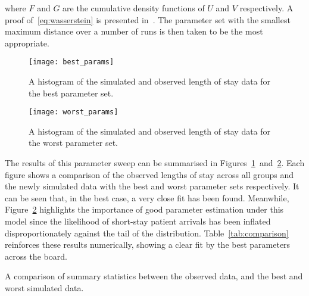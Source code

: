 \noindent where \(F\) and \(G\) are the cumulative density functions of \(U\)
and \(V\) respectively. A proof of~\eqref{eq:wasserstein} is presented
in~\cite{Ramdas2017}. The parameter set with the smallest maximum distance over
a number of runs is then taken to be the most appropriate.

\begin{figure}
    \centering%
    \texttt{[image: best\_params]}
    \caption{A histogram of the simulated and observed length of stay data for
             the best parameter set.}\label{fig:best_params}
\end{figure}

\begin{figure}
    \centering%
    \texttt{[image: worst\_params]}
    \caption{A histogram of the simulated and observed length of stay data for
             the worst parameter set.}\label{fig:worst_params}
\end{figure}

The results of this parameter sweep can be summarised in
Figures~\ref{fig:best_params}~and~\ref{fig:worst_params}. Each figure shows a
comparison of the observed lengths of stay across all groups and the newly
simulated data with the best and worst parameter sets respectively. It can be
seen that, in the best case, a very close fit has been found. Meanwhile,
Figure~\ref{fig:worst_params} highlights the importance of good parameter
estimation under this model since the likelihood of short-stay patient arrivals
has been inflated disproportionately against the tail of the distribution.
Table~\ref{tab:comparison} reinforces these results numerically, showing a
clear fit by the best parameters across the board.

\begin{table}
    \centering
    
    \caption{A comparison of summary statistics between the observed data, and
        the best and worst simulated data.}\label{tab:comparison}
\end{table}
